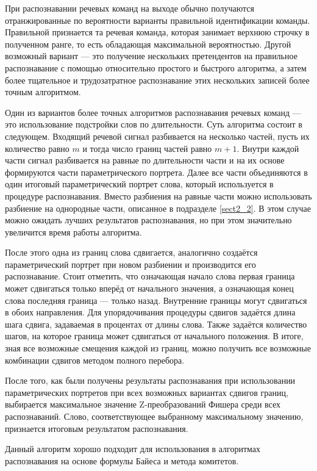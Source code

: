 При распознавании речевых команд на выходе обычно получаются отранжированные по вероятности варианты правильной идентификации команды.
Правильной признается та речевая команда, которая занимает верхнюю строчку в полученном ранге, то есть обладающая максимальной вероятностью.
Другой возможный вариант --- это получение нескольких претендентов на правильное распознавание с помощью относительно простого и быстрого алгоритма, а затем более тщательное и трудозатратное распознавание этих нескольких записей более точным алгоритмом.

Один из вариантов более точных алгоритмов распознавания речевых команд --- это использование подстройки слов по длительности.
Суть алгоритма состоит в следующем.
Входящий речевой сигнал разбивается на несколько частей, пусть их количество равно $m$ и тогда число границ частей равно $m+1$.
Внутри каждой части сигнал разбивается на равные по длительности части и на их основе формируются части параметрического портрета.
Далее все части объединяются в один итоговый параметрический портрет слова, который используется в процедуре распознавания.
Вместо разбиения на равные части можно использовать разбиение на однородные части, описанное в подразделе \ref{sect2_2}.
В этом случае можно ожидать лучших результатов распознавания, но при этом значительно увеличится время работы алгоритма.

После этого одна из границ слова сдвигается, аналогично создаётся параметрический портрет при новом разбиении и производится его распознавание.
Стоит отметить, что означающая начало слова первая граница может сдвигаться только вперёд от начального значения, а означающая конец слова последняя граница --- только назад.
Внутренние границы могут сдвигаться в обоих направления.
Для упорядочивания процедуры сдвигов задаётся длина шага сдвига, задаваемая в процентах от длины слова.
Также задаётся количество шагов, на которое граница может сдвигаться от начального положения.
В итоге, зная все возможные смещения каждой из границ, можно получить все возможные комбинации сдвигов методом полного перебора.

После того, как были получены результаты распознавания при использовании параметрических портретов при всех возможных вариантах сдвигов границ, выбирается максимальное значение Z-преобразований Фишера среди всех распознаваний.
Слово, соответствующее выбранному максимальному значению, признается итоговым результатом распознавания.

Данный алгоритм хорошо подходит для использования в алгоритмах распознавания на основе формулы Байеса и метода комитетов.


